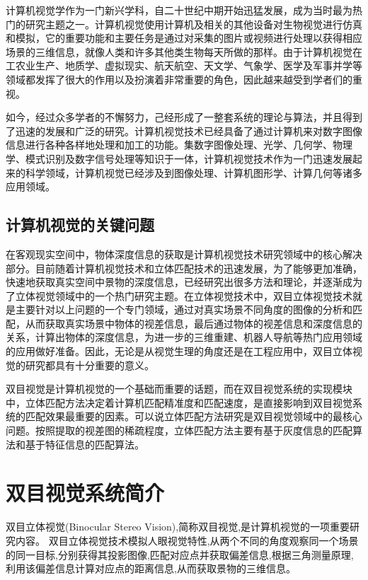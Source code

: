 计算机视觉学作为一门新兴学科，自二十世纪中期开始迅猛发展，成为当时最为热门的研究主题之一。计算机视觉使用计算机及相关的其他设备对生物视觉进行仿真和模拟，它的重要功能和主要任务是通过对采集的图片或视频进行处理以获得相应场景的三维信息，就像人类和许多其他类生物每天所做的那样。由于计算机视觉在工农业生产、地质学、虚拟现实、航天航空、天文学、气象学、医学及军事并学等领域都发挥了很大的作用以及扮演着非常重要的角色，因此越来越受到学者们的重视。

如今，经过众多学者的不懈努力，己经形成了一整套系统的理论与算法，并且得到了迅速的发展和广泛的研究。计算机视觉技术已经具备了通过计算机来对数字图像信息进行各种各样地处理和加工的功能。集数字图像处理、光学、几何学、物理学、模式识别及数字信号处理等知识于一体，计算机视觉技术作为一门迅速发展起来的科学领域，计算机视觉已经涉及到图像处理、计算机图形学、计算几何等诸多应用领域。

\subsection{计算机视觉的关键问题}

在客观现实空间中，物体深度信息的获取是计算机视觉技术研究领域中的核心解决部分。目前随着计算机视觉技术和立体匹配技术的迅速发展，为了能够更加准确，快速地获取真实空间中景物的深度信息，已经研究出很多方法和理论，并逐渐成为了立体视觉领域中的一个热门研究主题。在立体视觉技术中，双目立体视觉技术就是主要针对以上问题的一个专门领域，通过对真实场景不同角度的图像的分析和匹配，从而获取真实场景中物体的视差信息，最后通过物体的视差信息和深度信息的关系，计算出物体的深度信息，为进一步的三维重建、机器人导航等热门应用领域的应用做好准备。因此，无论是从视觉生理的角度还是在工程应用中，双目立体视觉的研究都具有十分重要的意义。 

双目视觉是计算机视觉的一个基础而重要的话题，而在双目视觉系统的实现模块中，立体匹配方法决定着计算机匹配精准度和匹配速度，是直接影响到双目视觉系统的匹配效果最重要的因素。可以说立体匹配方法研究是双目视觉领域中的最核心问题。按照提取的视差图的稀疏程度，立体匹配方法主要有基于灰度信息的匹配算法和基于特征信息的匹配算法。

\section{双目视觉系统简介}
双目立体视觉(Binocular Stereo Vision),简称双目视觉,是计算机视觉的一项重要研究内容。
双目立体视觉技术模拟人眼视觉特性,从两个不同的角度观察同一个场景的同一目标,分别获得其投影图像,匹配对应点并获取偏差信息,根据三角测量原理,利用该偏差信息计算对应点的距离信息,从而获取景物的三维信息。

